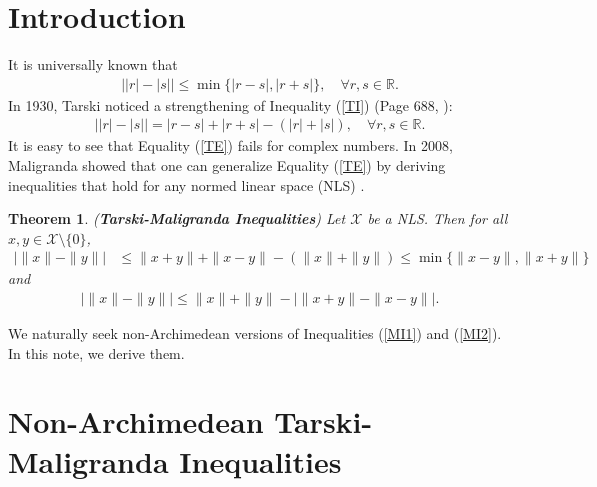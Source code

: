 \documentclass{amsart}
\newtheorem{theorem}{Theorem}[section]
\begin{document}
\section{Introduction}
It is universally known that 
\begin{align}\label{TI}
	\bigg||r|-|s|\bigg|\leq \min\{|r-s|, |r+s|\}, \quad \forall r, s \in \mathbb{R}.
\end{align}
In 1930, Tarski noticed a strengthening of Inequality (\ref{TI}) (Page 688, \cite{TARSKI}):
\begin{align}\label{TE}
		\bigg||r|-|s|\bigg|=|r-s|+ |r+s|-(|r|+|s|), \quad \forall r, s \in \mathbb{R}.
\end{align}
It is easy to see that Equality (\ref{TE}) fails for complex numbers. In 2008, Maligranda showed that one can generalize Equality (\ref{TE}) by deriving  inequalities that hold for any normed linear space (NLS) \cite{MALIGRANDA}.
\begin{theorem} \cite{MALIGRANDA} \label{MT} (\textbf{Tarski-Maligranda Inequalities})
Let $\mathcal{X}$ be a NLS. Then for all $x, y \in \mathcal{X}\setminus\{0\}$, 
\begin{align}\label{MI1}
	\bigg|\|x\|-\|y\|\bigg|&\leq \|x+y\|+\|x-y\|-(\|x\|+\|y\|)\leq \min\{\|x-y\|, \|x+y\|\}
\end{align}
and 
\begin{align}\label{MI2}
	\bigg|\|x\|-\|y\|\bigg|\leq \|x\|+\|y\|-\bigg|\|x+y\|-\|x-y\|\bigg|.
\end{align}
\end{theorem}
We naturally seek non-Archimedean versions of Inequalities (\ref{MI1}) and (\ref{MI2}). In this note, we derive them. 









\section{Non-Archimedean Tarski-Maligranda Inequalities}
\end{document}
